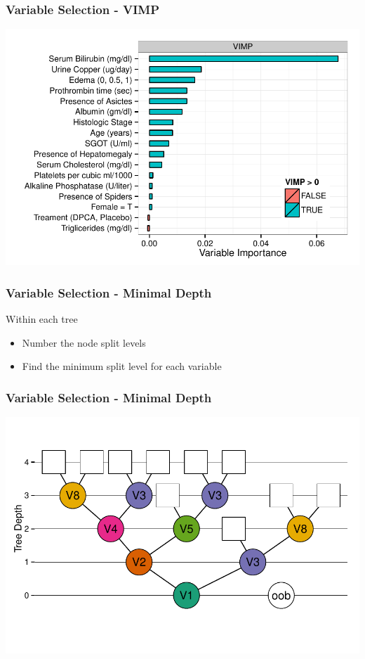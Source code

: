 \documentclass[xcolor=svgnames]{beamer}\usepackage[]{graphicx}\usepackage[]{color}
\newenvironment{knitrout}{}{} %
\begin{document}
\begin{frame}
\frametitle{Variable Selection - VIMP}
\begin{knitrout}\footnotesize
{}\color{fgcolor}

{\centering \includegraphics[width=.9\linewidth]{figures/rf-pbc-vimp-1} 

}



\end{knitrout}
\end{frame}
\begin{frame}
\frametitle{Variable Selection - Minimal Depth}

Within each tree
\begin{itemize}
\item  Number the node split levels
\item Find the minimum split level for each variable
\end{itemize}

\end{frame}
\begin{frame}
\frametitle{Variable Selection - Minimal Depth}
\begin{knitrout}\footnotesize
{}\color{fgcolor}

{\centering \includegraphics[width=.9\linewidth]{figures/treeDepth-1} 

}



\end{knitrout}
\end{frame}
\end{document}
